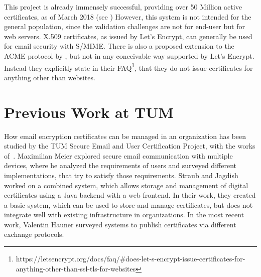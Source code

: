 This project is already immensely successful, providing over 50 Million active certificates, as of March 2018 (see
)
However, this system is not intended for the general population, since the validation challenges are not for end-user but for web servers.
X.509 certificates, as issued by Let's Encrypt, can generally be used for email security with S/MIME\@.
There is also a proposed extension to the ACME protocol by \citet{melnikovAcmeSmime}, but not in any conceivable way
supported by Let's Encrypt.
Instead they explicitly state in their FAQ\footnote{https://letsencrypt.org/docs/faq/#does-let-s-encrypt-issue-certificates-for-anything-other-than-ssl-tls-for-websites},
that they do not issue certificates for anything other than websites.

\section*{Previous Work at TUM}
How email encryption certificates can be managed in an organization has been studied by the TUM Secure Email and User
Certification Project, with the works
of~\citet{hauner2016interoperability, jagdish2016certservice, straub2016directoryservice, maier2015multidevice}.
Maximilian Meier explored secure email communication with multiple devices, where he analyzed the requirements of
users and surveyed different implementations, that try to satisfy those requirements.
Straub and Jagdish worked on a combined system, which allows storage and management of digital certificates using a Java
backend with a web frontend.
In their work, they created a basic system, which can be used to store and manage certificates, but does not integrate
well with existing infrastructure in organizations.
In the most recent work, Valentin Hauner surveyed systems to publish certificates via different exchange protocols.
